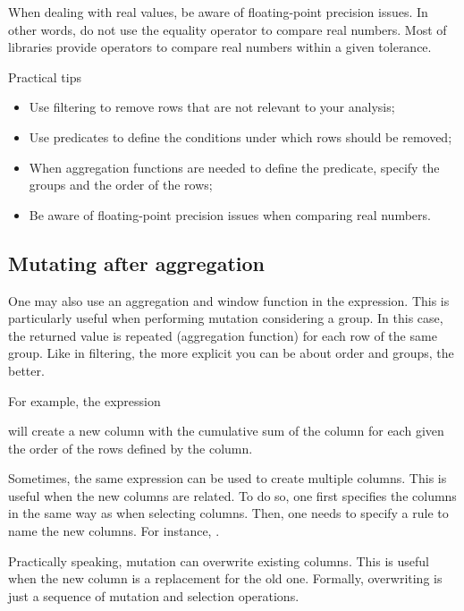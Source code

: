 When dealing with real values, be aware of floating-point precision issues.  In other
words, do not use the equality operator to compare real numbers.  Most of libraries
provide operators to compare real numbers within a given tolerance.

\begin{hlbox}{Practical tips}
  \begin{itemize}
    \item Use filtering to remove rows that are not relevant to your analysis;
    \item Use predicates to define the conditions under which rows should be removed;
    \item When aggregation functions are needed to define the predicate, specify the groups and
      the order of the rows;
    \item Be aware of floating-point precision issues when comparing real numbers.
  \end{itemize}
\end{hlbox}

\subsection{Mutating after aggregation}

One may also use an aggregation and window function in the expression. This is particularly
useful when performing mutation considering a group.  In this case, the returned value is
repeated (aggregation function) for each row of the same group.  Like in filtering, the
more explicit you can be about order and groups, the better.

For example, the expression
\begin{center}
\end{center}
will create a new column  with the cumulative sum of the  column for each
 given the order of the rows defined by the  column.

Sometimes, the same expression can be used to create multiple columns.  This is useful
when the new columns are related.  To do so, one first specifies the columns in the same way as
when selecting columns.  Then, one needs to specify a rule to name the new columns.
For instance, .

Practically speaking, mutation can overwrite existing columns.  This is useful when the
new column is a replacement for the old one.  Formally, overwriting is just a sequence of
mutation and selection operations.

